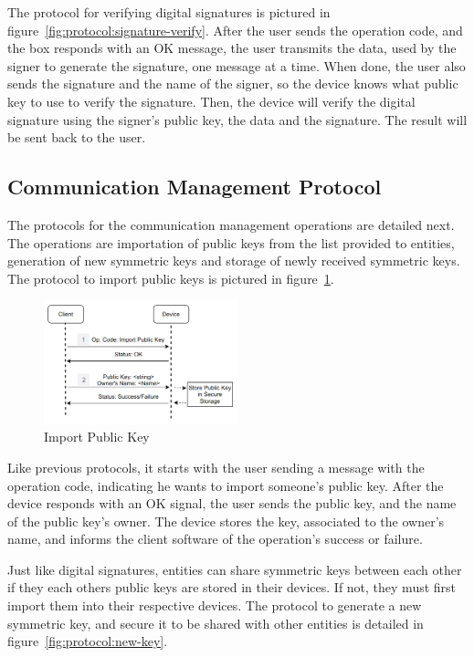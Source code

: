 The protocol for verifying digital signatures is pictured in figure~\ref{fig:protocol:signature-verify}.
After the user sends the operation code, and the box responds with an OK message, the user transmits the data, used by the signer to generate the signature, one message at a time.
When done, the user also sends the signature and the name of the signer, so the device knows what public key to use to verify the signature.
Then, the device will verify the digital signature using the signer's public key, the data and the signature. The result will be sent back to the user.

\subsection{Communication Management Protocol}\label{chap:implementation:protocol:key}

The protocols for the communication management operations are detailed next. The operations are importation of public keys from the list provided to entities, generation of new symmetric keys and storage of newly received symmetric keys.
The protocol to import public keys is pictured in figure~\ref{fig:protocol:import-pub}.

\begin{figure}[h]
	\centering
	\includegraphics[width=0.5\textwidth]{./Images/import-pub-key.png}
	\caption{Import Public Key}\label{fig:protocol:import-pub}
\end{figure}

Like previous protocols, it starts with the user sending a message with the operation code, indicating he wants to import someone's public key.
After the device responds with an OK signal, the user sends the public key, and the name of the public key's owner.
The device stores the key, associated to the owner's name, and informs the client software of the operation's success or failure.

\hfill
\hfill

Just like digital signatures, entities can share symmetric keys between each other if they each others public keys are stored in their devices. If not, they must first import them into their respective devices.
The protocol to generate a new symmetric key, and secure it to be shared with other entities is detailed in figure~\ref{fig:protocol:new-key}.

